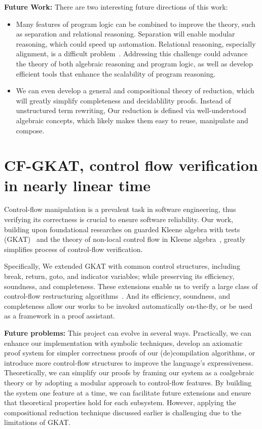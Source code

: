 \documentclass[11pt,a4paper,sans]{moderncv} %
\begin{document}
\textbf{Future Work:}
There are two interesting future directions of this work:
\begin{itemize}
  \item 
  Many features of program logic can be combined to improve the theory, such as separation and relational reasoning. 
  Separation will enable modular reasoning, which could speed up automation. 
  Relational reasoning, especially alignment, is a difficult problem~\cite{antonopoulos_AlgebraAlignmentRelational_2023, azevedodeamorim_KleeneAlgebraCommutativity_2024, kuznetsov_ComplexityReasoningKleene_2023}. 
  Addressing this challenge could advance the theory of both algebraic reasoning and program logic, as well as develop efficient tools that enhance the scalability of program reasoning.
  \item 
  We can even develop a general and compositional theory of reduction, which will greatly simplify completeness and decidablility proofs.
  Instead of unstructured term rewriting, Our reduction is defined via well-understood algebraic concepts, which likely makes them easy to reuse, manipulate and compose.
\end{itemize}


\section{CF-GKAT, control flow verification in nearly linear time}

Control-flow manipulation is a prevalent task in software engineering, thus verifying its correctness is crucial to ensure software reliability.
Our work, building upon foundational researches on guarded Kleene algebra with tests (GKAT)~\cite{smolka_GuardedKleeneAlgebra_2020} and the theory of non-local control flow in Kleene algebra~\cite{kozen_NonlocalFlowControl_2008a}, greatly simplifies process of control-flow verification.

Specifically, We extended GKAT with common control structures, including break, return, goto, and indicator variables; while preserving its efficiency, soundness, and completeness.
These extensions enable us to verify a large class of control-flow restructuring algorithms~\cite{yakdan_NoMoreGotos_2015,basque_AhoySAILRThere_,erosa_TamingControlFlow_1994,kozen_CertificationCompilerOptimizations_2000a}.
And its efficiency, soundness, and completeness allow our works to be invoked automatically on-the-fly, or be used as a framework in a proof assistant.

\textbf{Future problems:}
This project can evolve in several ways. 
Practically, we can enhance our implementation with symbolic techniques, develop an axiomatic proof system for simpler correctness proofs of our (de)compilation algorithms, or introduce more control-flow structures to improve the language's expressiveness.
Theoretically, we can simplify our proofs by framing our system as a coalgebraic theory or by adopting a modular approach to control-flow features. 
By building the system one feature at a time, we can facilitate future extensions and ensure that theoretical properties hold for each subsystem. 
However, applying the compositional reduction technique discussed earlier is challenging due to the limitations of GKAT.
\end{document}
